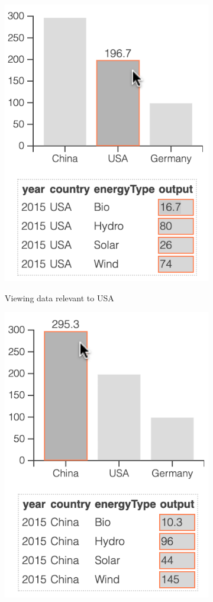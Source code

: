\begin{figure}[H]
   \begin{subfigure}[b]{0.45\textwidth}
      \centering
      {\includegraphics[scale=0.3]{fig/example/data-linking-1.png}}
      \caption{Viewing data relevant to USA}
   \end{subfigure}
   \begin{subfigure}[b]{0.45\textwidth}
      \centering
      {\includegraphics[scale=0.3]{fig/example/data-linking-2.png}}

\end{subfigure}
\end{figure}
